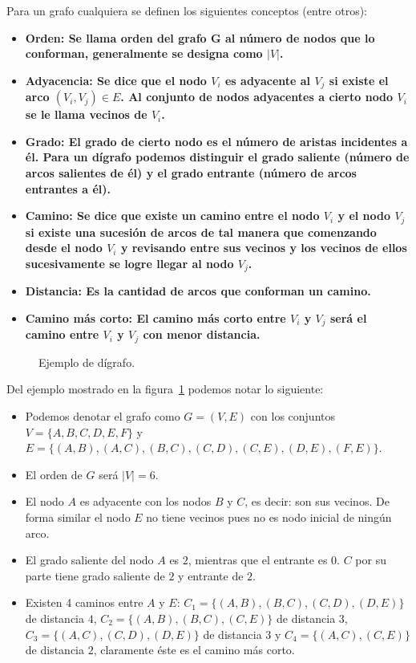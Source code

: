 Para un grafo cualquiera se definen los siguientes conceptos (entre otros):
\begin{itemize}
  \item \bf{Orden:}
    Se llama orden del grafo G al número de nodos que lo conforman, generalmente
    se designa como $|V|$.
  \item \bf{Adyacencia:}
    Se dice que el nodo $V_i$ es adyacente al $V_j$ si existe el arco 
    $(V_i, V_j) \in E$. Al conjunto de nodos adyacentes a cierto nodo $V_i$ se
    le llama \bf{vecinos} de $V_i$.
  \item \bf{Grado:}
    El grado de cierto nodo es el número de aristas incidentes a él. Para un
    dígrafo podemos distinguir el grado saliente (número de arcos salientes de
    él) y el grado entrante (número de arcos entrantes a él).
  \item \bf{Camino:}
    Se dice que existe un camino entre el nodo $V_i$ y el nodo $V_j$ si existe
    una sucesión de arcos de tal manera que comenzando desde el nodo $V_i$ y
    revisando entre sus vecinos y los vecinos de ellos sucesivamente se logre
    llegar al nodo $V_j$.
  \item \bf{Distancia:}
    Es la cantidad de arcos que conforman un camino.
  \item \bf{Camino más corto:}
    El camino más corto entre $V_i$ y $V_j$ será el camino entre $V_i$ y $V_j$
    con menor distancia.
\end{itemize}

\begin{figure}[htpb]
  \centering
  
  \caption{Ejemplo de dígrafo.}
  \label{fig:exgraph}
\end{figure}

Del ejemplo mostrado en la figura~\ref{fig:exgraph} podemos notar lo siguiente:
\begin{itemize}
  \item
    Podemos denotar el grafo como $G = (V,E)$ con los conjuntos 
    $V = \{A,B,C,D,E,F\}$ y 
    $E = \{(A,B),(A,C),(B,C),(C,D),(C,E),(D,E),(F,E)\}$.
  \item 
    El orden de $G$ será $|V| = 6$.
  \item
    El nodo $A$ es adyacente con los nodos $B$ y $C$, es decir: son sus vecinos.
    De forma similar el nodo $E$ no tiene vecinos pues no es nodo inicial de
    ningún arco.
  \item
    El grado saliente del nodo $A$ es $2$, mientras que el entrante es $0$.
    $C$ por su parte tiene grado saliente de $2$ y entrante de $2$.
  \item
    Existen 4 caminos entre $A$ y $E$: $C_1 = \{(A,B),(B,C),(C,D),(D,E)\}$ de
    distancia $4$, $C_2 = \{(A,B),(B,C),(C,E)\}$ de distancia $3$,
    $C_3 = \{(A,C),(C,D),(D,E)\}$ de distancia $3$ y
    $C_4 = \{(A,C),(C,E)\}$ de distancia $2$, claramente éste es el camino más
    corto.
\end{itemize}

